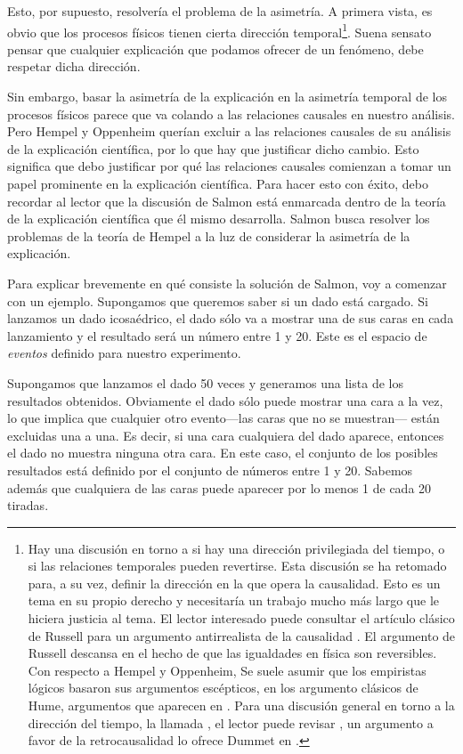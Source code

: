 Esto, por supuesto, resolvería el problema de la asimetría.
A primera vista, es obvio que los procesos físicos tienen
cierta dirección temporal\footnote{ 
  Hay una discusión en torno a si hay una dirección
  privilegiada del tiempo, o si las relaciones temporales
  pueden revertirse. Esta discusión se ha retomado para, a
  su vez, definir la dirección en la que opera la
  causalidad. Esto es un tema en su propio derecho y
  necesitaría un trabajo mucho más largo que le hiciera
  justicia al tema. El lector interesado puede consultar el
  artículo clásico de Russell para un argumento
  antirrealista de la causalidad
  \parencite{onthecauserussell}. El argumento de Russell
  descansa en el hecho de que las igualdades en física son
  reversibles. Con respecto a Hempel y Oppenheim, Se suele
  asumir que los empiristas lógicos basaron sus argumentos
  escépticos, en los argumento clásicos de Hume, argumentos
  que aparecen en \parencite{hume1784}. Para una discusión
  general en torno a la dirección del tiempo, la llamada
  , el lector puede revisar
  \parencite{utmArrowTime}, un argumento a favor de la
  retrocausalidad lo ofrece Dummet en
  \parencite{dummetcause}.
}.
Suena sensato pensar que cualquier explicación que podamos
ofrecer de un fenómeno, debe respetar dicha dirección.

Sin embargo, basar la asimetría de la explicación en la
asimetría temporal de los procesos físicos parece que va
colando a las relaciones causales en nuestro análisis. Pero
Hempel y Oppenheim querían excluir a las relaciones causales
de su análisis de la explicación científica, por lo que hay
que justificar dicho cambio. Esto significa que debo
justificar por qué las relaciones causales comienzan a tomar
un papel prominente en la explicación científica. Para hacer
esto con éxito, debo recordar al lector que la discusión de
Salmon está enmarcada dentro de la teoría de la explicación
científica que él mismo desarrolla. Salmon busca resolver
los problemas de la teoría de Hempel a la luz de considerar
la asimetría de la explicación.

Para explicar brevemente en qué consiste la solución de
Salmon, voy a comenzar con un ejemplo. Supongamos que
queremos saber si un dado está cargado. Si lanzamos un dado
icosaédrico, el dado sólo va a mostrar una de sus caras en
cada lanzamiento y el resultado será un número entre 1 y 20.
Este es el espacio de \emph{eventos} definido para nuestro
experimento.

Supongamos que lanzamos el dado 50 veces y generamos una
lista de los resultados obtenidos. Obviamente el dado sólo
puede mostrar una cara a la vez, lo que implica que
cualquier otro evento---las caras que no se muestran---
están excluidas una a una. Es decir, si una cara cualquiera
del dado aparece, entonces el dado no muestra ninguna otra
cara. En este caso, el conjunto de los posibles resultados
está definido por el conjunto de números entre 1 y 20.
Sabemos además que cualquiera de las caras puede aparecer
por lo menos 1 de cada 20 tiradas.

